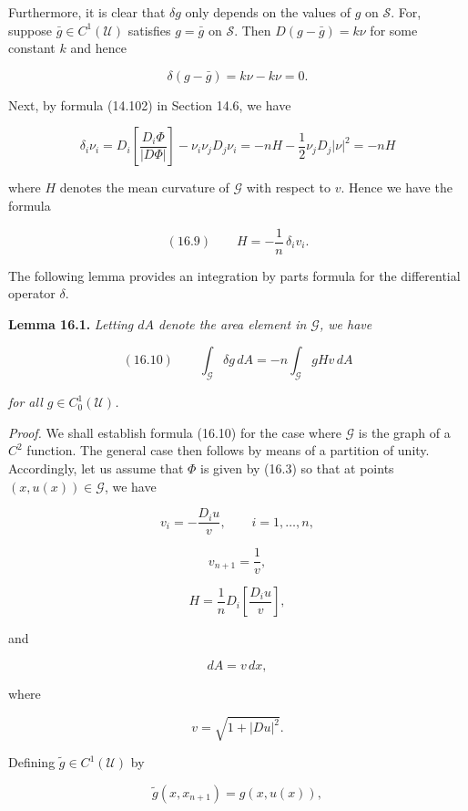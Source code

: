 Furthermore, it is clear that $\delta g$ only depends on the values of $g$ on $\mathcal S$. For, suppose
$\bar g \in C^1(\mathcal U)$ satisfies $g=\bar g$ on $\mathcal S$. Then $D(g-\bar g)=k\nu$ for some constant $k$ and hence

\[
\delta(g-\bar g)=k\nu-k\nu=0.
\]

Next, by formula (14.102) in Section 14.6, we have

\[
\delta_i \nu_i = D_i\left[\frac{D_i\Phi}{|D\Phi|}\right] - \nu_i\nu_j D_j \nu_i
= -nH - \frac12 \nu_j D_j |\nu|^2
= -nH
\]


where $H$ denotes the mean curvature of $\mathcal{G}$ with respect to $v$. Hence we have the formula

\[
(16.9)\qquad H = - \frac{1}{n}\,\delta_i v_i.
\]

The following lemma provides an integration by parts formula for the differential operator $\delta$.

\medskip

\textbf{Lemma 16.1.} \emph{Letting $dA$ denote the area element in $\mathcal{G}$, we have}

\[
(16.10)\qquad \int_{\mathcal{G}} \delta g\, dA = -n \int_{\mathcal{G}} gHv\, dA
\]

\emph{for all $g \in C^1_0(\mathcal{U})$.}

\medskip

\textit{Proof.} We shall establish formula (16.10) for the case where $\mathcal{G}$ is the graph of a $C^2$ function. The general case then follows by means of a partition of unity. Accordingly, let us assume that $\Phi$ is given by (16.3) so that at points $(x,u(x)) \in \mathcal{G}$, we have

\[
v_i = - \frac{D_i u}{v}, \qquad i = 1,\dots,n,
\]

\begin{equation}
\tag{16.11}
v_{n+1} = \frac{1}{v},
\end{equation}

\[
H = \frac{1}{n} D_i \!\left[\frac{D_i u}{v}\right],
\]

and

\[
dA = v\, dx,
\]

where

\[
v = \sqrt{1 + |Du|^2}.
\]

Defining $\tilde g \in C^1(\mathcal{U})$ by

\[
\tilde g(x,x_{n+1}) = g(x,u(x)),
\]

